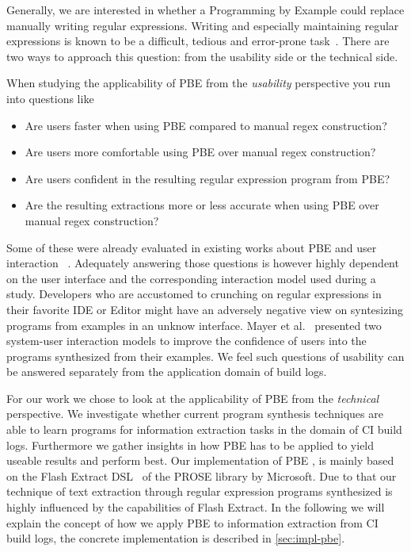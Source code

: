 \documentclass[\myrootdir/main.tex]{subfiles}
\begin{document}
Generally, we are interested in whether a Programming by Example could replace manually writing regular expressions.
Writing and especially maintaining regular expressions is known to be a difficult, tedious and error-prone task~\cite{michael2019regexes}.
There are two ways to approach this question: from the usability side or the technical side.

When studying the applicability of PBE from the \emph{usability} perspective you run into questions like
\begin{itemize}
	\item Are users faster when using PBE compared to manual regex construction?
	\item Are users more comfortable using PBE over manual regex construction?
	\item Are users confident in the resulting regular expression program from PBE?
	\item Are the resulting extractions more or less accurate when using PBE over manual regex construction?
\end{itemize}
Some of these were already evaluated in existing works about PBE and user interaction~\cite{mayer2015user} .
Adequately answering those questions is however highly dependent on the user interface and the corresponding interaction model used during a study.
Developers who are accustomed to crunching on regular expressions in their favorite IDE or Editor might have an adversely negative view on syntesizing programs from examples in an unknow interface.
Mayer et al.~\cite{mayer2015user} presented two system-user interaction models to improve the confidence of users into the programs synthesized from their examples.
We feel such questions of usability can be answered separately from the application domain of build logs.

For our work we chose to look at the applicability of PBE from the \emph{technical} perspective.
We investigate whether current program synthesis techniques are able to learn programs for information extraction tasks in the domain of CI build logs.
Furthermore we gather insights in how PBE has to be applied to yield useable results and perform best.
Our implementation of PBE , is mainly based on the Flash Extract DSL~\cite{flahsextractpaper} of the PROSE library by Microsoft.
Due to that our technique of text extraction through regular expression programs synthesized is highly influenced by the capabilities of Flash Extract.
In the following we will explain the concept of how we apply PBE to information extraction from CI build logs, the concrete implementation is described in \ref{sec:impl-pbe}.
\end{document}
